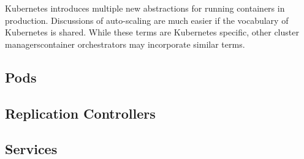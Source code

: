 Kubernetes introduces multiple new abstractions for running containers in
production. Discussions of auto-scaling are much easier if the vocabulary of
Kubernetes is shared. While these terms are Kubernetes specific, other cluster
managers\/container orchestrators may incorporate similar terms.

\subsection{Pods}



\subsection{Replication Controllers}



\subsection{Services}


